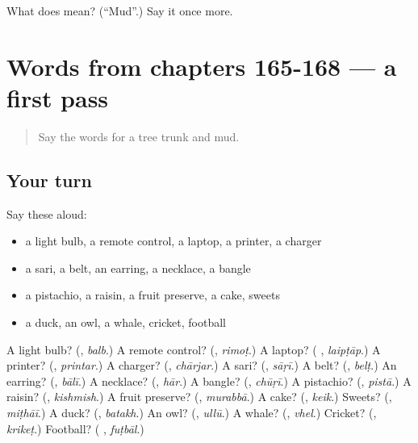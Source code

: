 \begin{tcolorbox}[breakable,colback=teal!4,colframe=teal!35!black,title={Before you move on}]
What does  mean? (\textquotedblleft{}Mud\textquotedblright{}.) Say it once more.
\end{tcolorbox}
\section[(dialogue)]{Words from chapters 165-168 — a first pass}

\label{lesson:UR-R173-first-pass-words-from-chapters-165-168}



\begin{quote}
Say the words for a tree trunk and mud.
\end{quote}

\subsection*{Your turn}
Say these aloud:

\begin{itemize}
\raggedright
  \item a light bulb, a remote control, a laptop, a printer, a charger
  \item a sari, a belt, an earring, a necklace, a bangle
  \item a pistachio, a raisin, a fruit preserve, a cake, sweets
  \item a duck, an owl, a whale, cricket, football
\end{itemize}

\begin{tcolorbox}[breakable,colback=teal!4,colframe=teal!35!black,title={Before you move on}]
A light bulb? (\textbf{}, \emph{balb}.) A remote control? (\textbf{}, \emph{rimoṭ}.) A laptop? (\textbf{ }, \emph{laipṭāp}.) A printer? (\textbf{}, \emph{printar}.) A charger? (\textbf{}, \emph{chārjar}.) A sari? (\textbf{}, \emph{sāṛī}.) A belt? (\textbf{}, \emph{belṭ}.) An earring? (\textbf{}, \emph{bālī}.) A necklace? (\textbf{}, \emph{hār}.) A bangle? (\textbf{}, \emph{chūṛī}.) A pistachio? (\textbf{}, \emph{pistā}.) A raisin? (\textbf{}, \emph{kishmish}.) A fruit preserve? (\textbf{}, \emph{murabbā}.) A cake? (\textbf{}, \emph{keik}.) Sweets? (\textbf{}, \emph{miṭhāī}.) A duck? (\textbf{}, \emph{batakh}.) An owl? (\textbf{}, \emph{ullū}.) A whale? (\textbf{}, \emph{vhel}.) Cricket? (\textbf{}, \emph{krikeṭ}.) Football? (\textbf{ }, \emph{fuṭbāl}.)
\end{tcolorbox}
